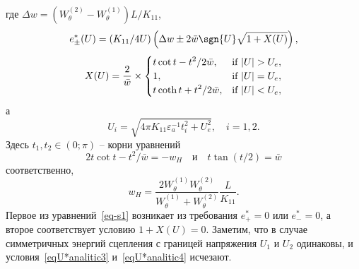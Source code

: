 где $ \Delta{w}=({W}^{(2)}_\theta-{W}^{(1)}_\theta)L/K_{11}$,
\begin{equation}\label{eq:!!}
e_\pm^*(U)=\left(K_{11}/4U\right)\left(\Delta{w}
\pm 2\bar{w}\sgn{U}\sqrt{ 1+X(U) }\right) ,
\end{equation}
\begin{equation}\label{eq:!!!}
X(U)=\frac{2}{\bar{w}}\times
\begin{cases}
\displaystyle t\cot t-{t^2}/2\bar{w}, \hspace{-0mm} & \mbox{if } |U|>U_e, \\
\displaystyle 1,\phantom{A^B_C} \hspace{-0mm} & \mbox{if } |U|=U_e, \\
\displaystyle t\coth t +{t^2}/2\bar{w}, \hspace{-0mm}& \mbox{if } |U|<U_e,
\end{cases}
\end{equation}
а
\begin{equation*}
U_i = \sqrt{4\pi K_{11}\varepsilon_a^{-1}t_i^2 + U_e^2}, \quad i=1,2.
\end{equation*}
Здесь $t_1,t_2\in(0;\pi)$ -- корни уравнений
\begin{equation}\label{eq-s1}
2t\cot t-{t^2}/\bar{w}=-{w}_H\quad \text{и}\quad t\tan (t/2)=\bar{w}
\end{equation}
соответственно,	
\begin{equation*}
{w}_H=\frac{2{W}^{(1)}_\theta{W}^{(2)}_\theta}{{W}^{(1)}_\theta+{W}^{(2)}_\theta}\frac{L}{K_{11}}.
\end{equation*}
Первое из уравнений~\eqref{eq-s1} возникает из требования $e_+^* = 0$ или  $e_-^* = 0$, а второе соответствует условию $1+X(U)=0$.
Заметим, что в случае симметричных энергий сцепления с границей напряжения $U_1$ и $U_2$ одинаковы, и условия~\eqref{eqU*analitic3} и~\eqref{eqU*analitic4} исчезают.


